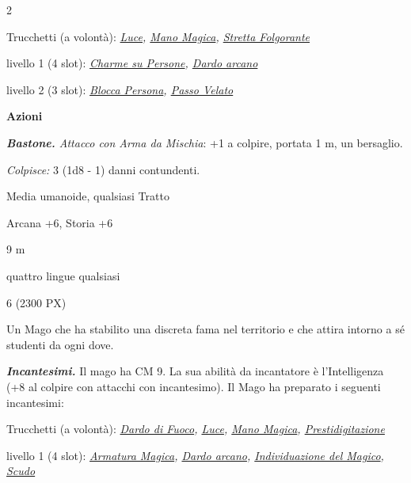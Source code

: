\begin{multicols}{2}
{Trucchetti (a volontà): \emph{\hyperlink{Luce}{Luce}, \hyperlink{Mano Magica}{Mano Magica}, \hyperlink{Stretta Folgorante}{Stretta Folgorante}}

livello 1 (4 slot): \emph{\hyperlink{Charme su Persone}{Charme su Persone},  \hyperlink{Dardo arcano}{Dardo arcano}}

livello 2 (3 slot): \emph{\hyperlink{Blocca Persona}{Blocca Persona}, \hyperlink{Passo Velato}{Passo Velato}}

\textbf{Azioni}

\emph{\textbf{Bastone.} Attacco con Arma da Mischia}: +1 a colpire, portata 1 m, un bersaglio.

\emph{Colpisce:} 3 (1d8 - 1) danni contundenti.

\begin{description}[noitemsep, topsep=0pt, parsep=0pt, partopsep=0pt, itemsep=1pt, leftmargin=2.35cm,  labelwidth=2.2cm, itemindent=0cm, listparindent=0pt] %
\setlength{\baselineskip}{10pt}
\item[\textbf{Taglia/Tipo}] Media umanoide, qualsiasi Tratto
\item[\textbf{Caratt.}] 
\item[\textbf{Punti Ferita}] 
\item[\textbf{Comp.}] Arcana +6, Storia +6
\item[\textbf{Tiri Salvez.}] 
\item[\textbf{Movimento}] 9 m
\item[\textbf{Linguaggi}] quattro lingue qualsiasi
\item[\textbf{Sfida}] 6 (2300 PX)
\end{description}
\smallskip

Un Mago che ha stabilito una discreta fama nel territorio e che attira intorno a sé studenti da ogni dove.

\emph{\textbf{Incantesimi.}} Il mago ha CM 9. La sua abilità da incantatore è l'Intelligenza (+8 al colpire con attacchi con incantesimo). Il Mago ha preparato i seguenti incantesimi:

Trucchetti (a volontà): \emph{\hyperlink{Dardo di Fuoco}{Dardo di Fuoco}, \hyperlink{Luce}{Luce}, \hyperlink{Mano Magica}{Mano Magica}, \hyperlink{Prestidigitazione}{Prestidigitazione}}

livello 1 (4 slot): \emph{\hyperlink{Armatura Magica}{Armatura Magica}, \hyperlink{Dardo arcano}{Dardo arcano}, \hyperlink{Individuazione del Magico}{Individuazione del Magico}, \hyperlink{Scudo}{Scudo}}

}
\end{multicols}

